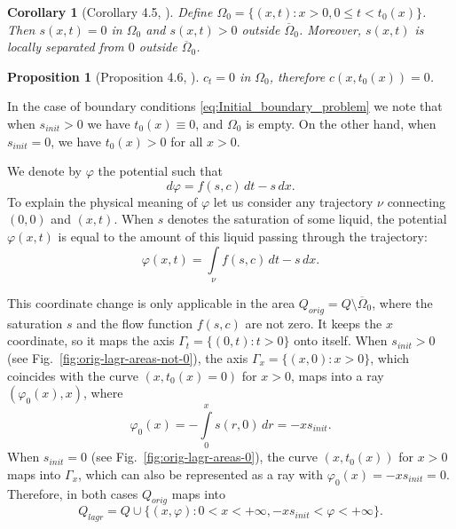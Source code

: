 \documentclass[12pt]{article}
\newtheorem{proposition}{Proposition}
\newtheorem{corollary}{Corollary}
\theoremstyle{definition}
\begin{document}
\begin{corollary}[Corollary 4.5, \cite{MR2024}]\label{corollary:zero_flow_area}
Define $\Omega_0 = \{(x,t): x > 0, 0\leqslant t < t_0(x)\}$. Then $s(x,t) = 0$ in $\Omega_0$ and $s(x,t) > 0$ outside $\overline{\Omega}_0$. Moreover, $s(x,t)$ is locally separated from $0$ outside $\overline{\Omega}_0$.
\end{corollary}


\begin{proposition}[Proposition 4.6, \cite{MR2024}]\label{prop:c_on_zero_boundary}
$c_t = 0$ in $\Omega_0$, therefore $c(x, t_0(x)) = 0$.
\end{proposition}

In the case of boundary conditions \eqref{eq:Initial_boundary_problem} we note that when $s_{init} > 0$ we have $t_0(x) \equiv 0$, and $\Omega_0$ is empty. On the other hand, when $s_{init} = 0$, we have $t_0(x) > 0$ for all $x>0$.

We denote by $\varphi$ the potential such that
\begin{equation} 
\label{eq:dPhi}
    d\varphi=f(s,c)\,dt-s\,dx.
\end{equation}
To explain the physical meaning of $\varphi$ let us consider any trajectory $\nu$ connecting $(0, 0)$ and $(x, t)$.
When $s$ denotes the saturation of some liquid, the potential $\varphi(x, t)$ is equal to the amount of this liquid
passing through the trajectory:
\begin{equation}
\label{eq:phi}
    \varphi(x,t)=\int\limits_{\nu} f(s,c)\,dt-s\,dx.
\end{equation}


This coordinate change is only applicable in the area $Q_{orig} = Q\setminus \overline{\Omega}_0$, where the saturation $s$ and the flow function $f(s,c)$ are not zero. It keeps the $x$ coordinate, so it maps the axis $\Gamma_t=\{(0,t): t>0\}$ onto itself. 
When $s_{init} > 0$ (see Fig.~\ref{fig:orig-lagr-areas-not-0}), the axis $\Gamma_x=\{(x,0): x>0\}$, which coincides with the curve $(x, t_0(x) = 0)$ for $x > 0$, maps into a ray $( \varphi_0(x), x)$, where
\begin{equation}
\label{eq:def_varphi_0}
\varphi_0(x) = -\int\limits_0^x s(r, 0) \, dr = - x s_{init}.
\end{equation}
When $s_{init} = 0$ (see Fig.~\ref{fig:orig-lagr-areas-0}), the curve $(x, t_0(x))$ for $x > 0$ maps into $\Gamma_x$, which can also be represented as a ray with  $\varphi_0(x) = - x s_{init} = 0$. Therefore, in both cases  $Q_{orig}$ maps into 
\[
Q_{lagr} = Q \cup \{ (x, \varphi) : 0 < x < +\infty, -x s_{init} < \varphi < +\infty  \}.
\]
\end{document}
